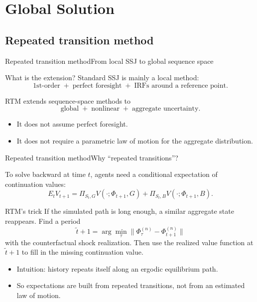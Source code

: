 \documentclass[aspectratio=169]{beamer}
\begin{document}
\section{Global Solution}

\subsection{Repeated transition method}

\begin{frame}{Repeated transition method}{From local SSJ to global sequence space}
\small

\begin{block}{What is the extension?}
Standard SSJ is mainly a \alert{local} method:
\[
\text{1st-order} \;+\; \text{perfect foresight} \;+\; \text{IRFs around a reference point}.
\]

RTM extends sequence-space methods to
\[
\text{global} \;+\; \text{nonlinear} \;+\; \text{aggregate uncertainty}.
\]
\end{block}

\begin{itemize}
    \item It does \alert{not} assume perfect foresight.
    \item It does \alert{not} require a parametric law of motion for the aggregate distribution.
\end{itemize}

\end{frame}

\begin{frame}{Repeated transition method}{Why ``repeated transitions''?}
\small

To solve backward at time $t$, agents need a conditional expectation of continuation values:
\[
E_t V_{t+1}
=
\Pi_{S_t,G} V(\cdot;\Phi_{t+1},G)
+
\Pi_{S_t,B} V(\cdot;\Phi_{t+1},B).
\]

\begin{block}{RTM's trick}
If the simulated path is long enough, a similar aggregate state reappears.
Find a period
\[
\tilde t+1
=
\arg\min_{\tau}\|\Phi_{\tau}^{(n)}-\Phi_{t+1}^{(n)}\|
\]
with the \alert{counterfactual shock realization}.
Then use the realized value function at $\tilde t+1$ to fill in the missing continuation value.
\end{block}

\begin{itemize}
    \item Intuition: \alert{history repeats itself} along an ergodic equilibrium path.
    \item So expectations are built from \alert{repeated transitions}, not from an estimated law of motion.
\end{itemize}

\end{frame}
\end{document}
